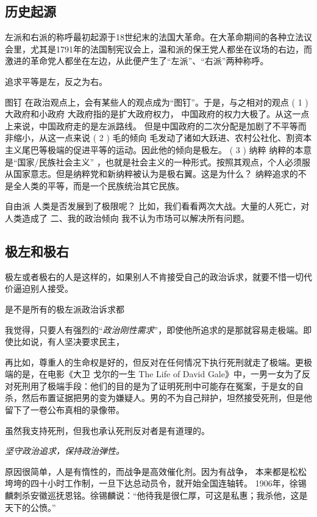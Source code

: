 \subsection{历史起源}
左派和右派的称呼最初起源于18世纪末的法国大革命。在大革命期间的各种立法议会里，尤其是1791年的法国制宪议会上，温和派的保王党人都坐在议场的右边，而激进的革命党人都坐在左边，从此便产生了“左派”、“右派”两种称呼。

追求平等是左，反之为右。


图钉
在政治观点上，会有某些人的观点成为“图钉”。于是，与之相对的观点
( 1 ) 大政府和小政府
大政府指的是扩大政府权力，
中国政府的权力大极了。从这一点上来说，中国政府走的是左派路线。
但是中国政府的二次分配是加剧了不平等而非缩小，从这一点来说
( 2 ) 毛的倾向
	毛发动了诸如大跃进、农村公社化、割资本主义尾巴等极端的促进平等的运动。因此他的倾向是极左。
( 3 ) 纳粹
纳粹的本意是“国家/民族社会主义” ，也就是社会主义的一种形式。按照其观点，个人必须服从国家意志。但是纳粹党和新纳粹被认为是极右翼。这是为什么？
纳粹追求的不是全人类的平等，而是一个民族统治其它民族。
	

自由派
人类是否发展到了极限呢？
比如，我们看看两次大战。大量的人死亡，对人类造成了
二、我的政治倾向
我不认为市场可以解决所有问题。

\subsection{极左和极右}
极左或者极右的人是这样的，如果别人不肯接受自己的政治诉求，就要不惜一切代价逼迫别人接受。

是不是所有的极左派政治诉求都

我觉得，只要人有强烈的“\textit{政治刚性需求}”，即使他所追求的是那就容易走极端。即使比如说，有人坚决要求民主，



再比如，尊重人的生命权是好的，但反对在任何情况下执行死刑就走了极端。更极端的是，在电影《大卫 戈尔的一生 The Life of David Gale》中，一男一女为了反对死刑用了极端手段：他们的目的是为了证明死刑中可能存在冤案，于是女的自杀，然后布置证据把男的变为嫌疑人。男的不为自己辩护，坦然接受死刑，但是他留下了一卷公布真相的录像带。

虽然我支持死刑，但我也承认死刑反对者是有道理的。

\emph{坚守政治追求，保持政治弹性。}


原因很简单，人是有惰性的，而战争是高效催化剂。因为有战争，
	本来都是松松垮垮的四十小时工作制，一旦下达总动员令，就开始全国连轴转。
	1906年，徐锡麟刺杀安徽巡抚恩铭。徐锡麟说：“他待我是很仁厚，可这是私惠；我杀他，这是天下的公愤。”
	



